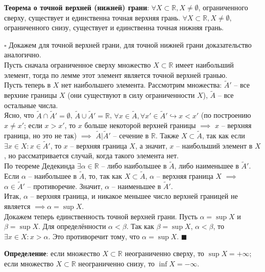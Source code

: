 \documentclass[12pt, a4paper, reqno]{article}
\begin{document}
    \textbf{Теорема о точной верхней (нижней) грани}: $\forall X \subset \mathbb{R}, X \neq \emptyset$,
    ограниченного сверху, существует и единственна точная верхняя грань. $\forall X \subset
    \mathbb{R}, X \neq \emptyset$, ограниченного снизу, существует и единственна точная нижняя грань.

    $\square$ Докажем для точной верхней грани, для точной нижней грани доказательство аналогично.\\
    Пусть сначала ограниченное сверху множество $X \subset \mathbb{R}$ имеет наибольший элемент,
    тогда по лемме этот элемент является точной верхней гранью.\\
    Пусть теперь в $X$ нет наибольшего элемента. Рассмотрим множества: $\tilde{A}'$ -- все верхние
    границы $X$ (они существуют в силу ограниченности $X$), $\tilde{A}$ -- все остальные числа.\\
    Ясно, что $\tilde{A} \cap \tilde{A}' = \emptyset$, $\tilde{A} \cup\tilde{A}' = \mathbb{R}$,
    $\forall x \in\tilde{A}, \forall x' \in\tilde{A}' \hookrightarrow x < x'$ (по построению
    $x \neq x'$; если $x > x'$, то $x$ больше некоторой верхней границы $\implies$ $x$ -- верхняя
    граница, но это не так) $\implies$ $\tilde{A}|\tilde{A}'$ -- сечение в $\mathbb{R}$. Также
    $X \subset \tilde{A}$, так как если $\exists x\in X: x\in \tilde{A}'$, то $x$ -- верхняя граница
    $X$, а значит, $x$ -- наибольший элемент в $X$, но рассматривается случай, когда такого элемента
    нет.\\
    По теореме Дедекинда $\exists\alpha\in\mathbb{R}$ -- либо наибольшее в $\tilde{A}$, либо
    наименьшее в $\tilde{A}'$. Если $\alpha$ -- наибольшее в $\tilde{A}$, то, так как
    $X \subset \tilde{A}$, $\alpha$ -- верхняя граница $X$ $\implies$ $\alpha\in\tilde{A}'$ --
    противоречие. Значит, $\alpha$ -- наименьшее в $\tilde{A}'$.\\
    Итак, $\alpha$ -- верхняя граница, и никакое меньшее число верхней границей не является
    $\implies \alpha = \sup X$.\\
    Докажем теперь единственность точной верхней грани. Пусть $\alpha = \sup X$ и $\beta = \sup X$.
    Для определённости $\alpha < \beta$. Так как $\beta = \sup X$, $\alpha < \beta$, то $\exists x
    \in X: x > \alpha$. Это противоречит тому, что $\alpha = \sup X$. $\blacksquare$

    \textbf{Определение}: если множество $X \subset\mathbb{R}$ неограниченно сверху, то
    $\sup X = +\infty$; если множество $X \subset\mathbb{R}$ неограниченно снизу, то $\inf X = -\infty$.
\end{document}
